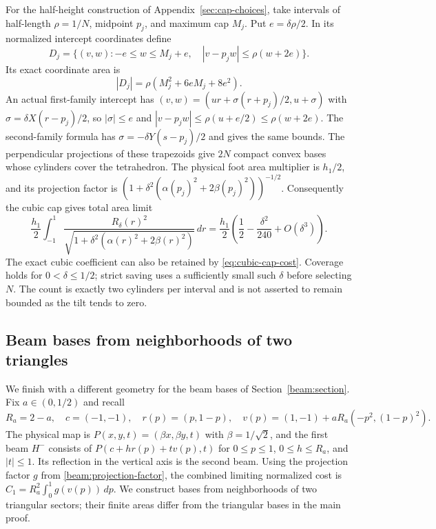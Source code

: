 For the half-height construction of Appendix~\ref{sec:cap-choices}, take intervals
of half-length $\rho=1/N$, midpoint $p_j$, and maximum cap $M_j$.
Put $e=\delta\rho/2$. In its normalized intercept coordinates define
\begin{equation}\label{eq:halfheight-trapezoid}
 D_j=\{(v,w):-e\le w\le M_j+e,\quad
             |v-p_jw|\le\rho(w+2e)\}.
\end{equation}
Its exact coordinate area is
\begin{equation}\label{eq:halfheight-trapezoid-area}
 |D_j|=\rho(M_j^2+6eM_j+8e^2).
\end{equation}
An actual first-family intercept has
$(v,w)=(ur+\sigma(r+p_j)/2,u+\sigma)$ with
$\sigma=\delta X(r-p_j)/2$, so $|\sigma|\le e$ and
$|v-p_jw|\le\rho(u+e/2)\le\rho(w+2e)$.
The second-family formula has
$\sigma=-\delta Y(s-p_j)/2$ and gives the same bounds.
The perpendicular projections of these trapezoids give $2N$ compact
convex bases whose cylinders cover the tetrahedron.
The physical foot area multiplier is $h_1/2$, and its projection factor
is $(1+\delta^2(\alpha(p_j)^2+2\beta(p_j)^2))^{-1/2}$.
Consequently the cubic cap gives total area limit
\[
 \frac{h_1}{2}\int_{-1}^1
 \frac{R_\delta(r)^2}{\sqrt{1+\delta^2(\alpha(r)^2+2\beta(r)^2)}}\,dr
 =\frac{h_1}{2}\left(\frac12-\frac{\delta^2}{240}+O(\delta^3)\right).
\]
The exact cubic coefficient can also be retained by
\eqref{eq:cubic-cap-cost}. Coverage holds for $0<\delta\le1/2$;
strict saving uses a sufficiently small such $\delta$ before selecting
$N$. The count is exactly two cylinders per interval and is not asserted
to remain bounded as the tilt tends to zero.

\subsection{Beam bases from neighborhoods of two triangles}
\label{beam:neighborhood-alternative}
We finish with a different geometry for the beam bases of
Section~\ref{beam:section}. Fix $a\in(0,1/2)$ and recall
\[
 R_a=2-a,\quad c=(-1,-1),\quad r(p)=(p,1-p),\quad
 v(p)=(1,-1)+aR_a(-p^2,(1-p)^2).
\]
The physical map is $P(x,y,t)=(\beta x,\beta y,t)$ with
$\beta=1/\sqrt2$, and the first beam $H^-$ consists of
$P(c+h r(p)+t v(p),t)$ for $0\le p\le1$, $0\le h\le R_a$,
and $|t|\le1$. Its reflection in the vertical axis is the second beam.
Using the projection factor $g$ from \eqref{beam:projection-factor},
the combined limiting normalized cost is
$C_1=R_a^2\int_0^1g(v(p))\,dp$.
We construct bases from neighborhoods of two triangular sectors; their
finite areas differ from the triangular bases in the main proof.


